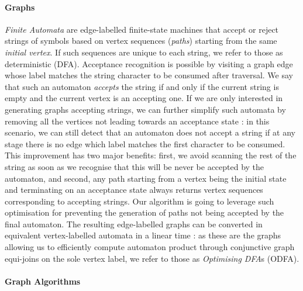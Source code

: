 \documentclass[sigconf]{acmart}
\begin{document}


\paragraph*{Graphs} %

\textit{Finite Automata} are edge-labelled finite-state machines that accept or reject strings of symbols based on vertex sequences (\textit{paths}) starting from the same \textit{initial vertex}. If such sequences are unique to each string, we refer to those as deterministic (DFA). Acceptance recognition is possible by visiting a graph edge whose label matches the string character to be consumed after traversal. We say that such an automaton \textit{accepts} the string if and only if the current string is empty and the current vertex is an accepting one. If we are only interested in generating graphs accepting strings, we can further simplify such automata by removing all the vertices not leading towards an acceptance state \cite{DBLP:conf/caise/CiccioBCM15}: in this scenario, we can still detect that an automaton does not accept a string if at any stage there is no edge which label matches the first character to be consumed. This improvement has two major benefits: first, we avoid scanning the rest of the string as soon as we recognise that this will be never be accepted by the automaton, and second, any path starting from a vertex being the initial state and terminating on an acceptance state always returns vertex sequences corresponding to accepting strings. Our algorithm is going to leverage such optimisation for preventing the generation of paths not being accepted by the final automaton. The resulting edge-labelled graphs can be converted in equivalent vertex-labelled automata in a linear time \cite{DBLP:conf/icpm/BergamiMMP21}: as these are the graphs allowing us to efficiently compute automaton product through conjunctive graph equi-joins on the sole vertex label, we refer to those as \textit{Optimising DFA}s (ODFA).


\paragraph*{Graph Algorithms}%
\end{document}
